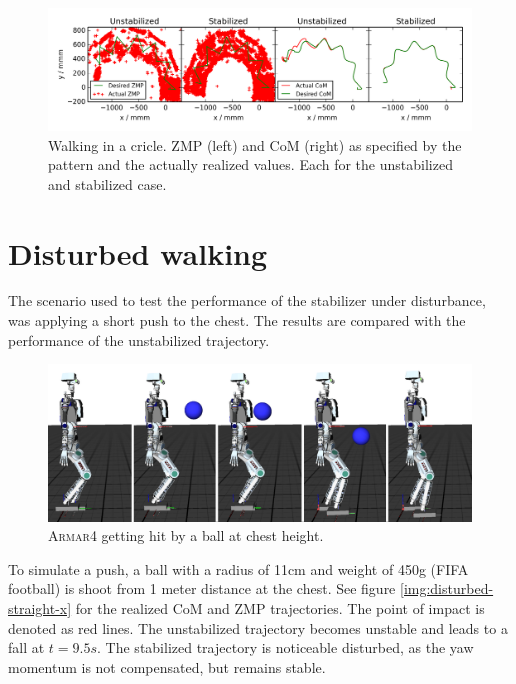 \documentclass[english,ngerman]{KITreprt}
\newcommand{\name}[1]{\textsc{#1}}
\begin{document}
\begin{figure}[hbt]
\vspace*{-1em}
\includegraphics[width=\textwidth,resolution=300]{images/undisturbed_circle.png}
\caption{Walking in a cricle. ZMP (left) and CoM (right) as specified by the pattern and the actually realized values.
Each for the unstabilized and stabilized case.}
\label{img:undisturbed-circle}
\end{figure}

\section{Disturbed walking}\label{disturbed-walking}

The scenario used to test the performance of the stabilizer under
disturbance, was applying a short push to the chest. The results are
compared with the performance of the unstabilized trajectory.

\begin{figure}[hbt]
\vspace*{-1em}
\includegraphics[width=\textwidth,resolution=300]{images/disturbed_straight_thumbs.png}
\caption{\name{Armar4} getting hit by a ball at chest height.}
\label{img:player-undisturbed-circle-thumbs}
\end{figure}

To simulate a push, a ball with a radius of 11cm and weight of 450g
(FIFA football) is shoot from 1 meter distance at the chest. See figure
\ref{img:disturbed-straight-x} for the realized CoM and ZMP
trajectories. The point of impact is denoted as red lines. The
unstabilized trajectory becomes unstable and leads to a fall at
$t = 9.5s$. The stabilized trajectory is noticeable disturbed, as the
yaw momentum is not compensated, but remains stable.
\end{document}
